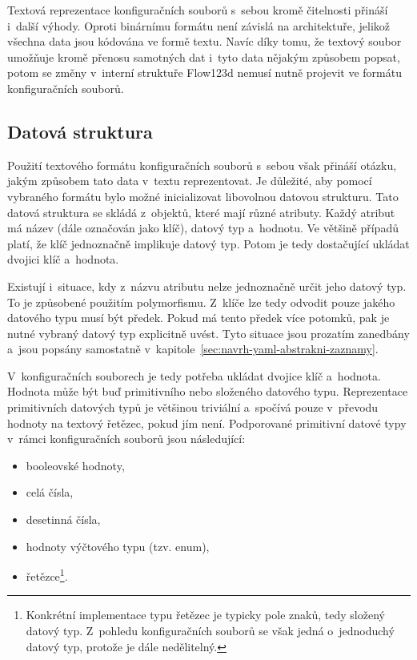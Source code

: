 \documentclass[FM,bw,DP]{tulthesis}
\begin{document}
Textová reprezentace konfiguračních souborů s~sebou kromě čitelnosti přináší i~další výhody. Oproti binárnímu formátu není závislá na architektuře, jelikož všechna data jsou kódována ve formě textu. Navíc díky tomu, že textový soubor umožňuje kromě přenosu samotných dat i~tyto data nějakým způsobem popsat, potom se změny v~interní struktuře Flow123d nemusí nutně projevit ve formátu konfiguračních souborů.

\subsection{Datová struktura}
\label{sec:datova-struktura}
Použití textového formátu konfiguračních souborů s~sebou však přináší otázku, jakým způsobem tato data v~textu reprezentovat. Je důležité, aby pomocí vybraného formátu bylo možné inicializovat libovolnou datovou strukturu. Tato datová struktura se skládá z~objektů, které mají různé atributy. Každý atribut má název (dále označován jako klíč), datový typ a~hodnotu. Ve většině případů platí, že klíč jednoznačně implikuje datový typ. Potom je tedy dostačující ukládat dvojici klíč a~hodnota.

Existují i~situace, kdy z~názvu atributu nelze jednoznačně určit jeho datový typ. To je způsobené použitím polymorfismu. Z~klíče lze tedy odvodit pouze jakého datového typu musí být předek. Pokud má tento předek více potomků, pak je nutné vybraný datový typ explicitně uvést. Tyto situace jsou prozatím zanedbány a~jsou popsány samostatně v~kapitole~\ref{sec:navrh-yaml-abstrakni-zaznamy}.

V~konfiguračních souborech je tedy potřeba ukládat dvojice klíč a~hodnota. Hodnota může být buď primitivního nebo složeného datového typu. Reprezentace primitivních datových typů je většinou triviální a~spočívá pouze v~převodu hodnoty na textový řetězec, pokud jím není. Podporované primitivní datové typy v~rámci konfiguračních souborů jsou následující:

\begin{itemize}
	\item booleovské hodnoty, %
	\item celá čísla,
	\item desetinná čísla,
	\item hodnoty výčtového typu (tzv. enum),
	\item řetězce\footnote{Konkrétní implementace typu řetězec je typicky pole znaků, tedy složený datový typ. Z~pohledu konfiguračních souborů se však jedná o~jednoduchý datový typ, protože je dále nedělitelný.}.
\end{itemize}
\end{document}
